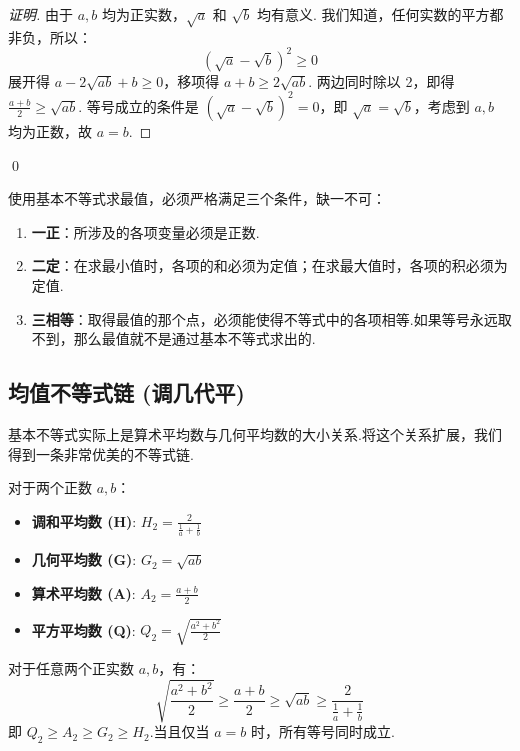 	\begin{proof}[证明]
		由于 $a, b$ 均为正实数，$\sqrt{a}$ 和 $\sqrt{b}$ 均有意义.
		我们知道，任何实数的平方都非负，所以：
		\begin{equation}
			(\sqrt{a} - \sqrt{b})^2 \ge 0
		\end{equation}
		展开得 $a - 2\sqrt{ab} + b \ge 0$，移项得 $a+b \ge 2\sqrt{ab}$.
		两边同时除以 2，即得 $\frac{a+b}{2} \ge \sqrt{ab}$.
		等号成立的条件是 $(\sqrt{a} - \sqrt{b})^2 = 0$，即 $\sqrt{a} = \sqrt{b}$，考虑到 $a, b$ 均为正数，故 $a=b$.
	\end{proof}
	\qed
	
			\begin{note}
				使用基本不等式求最值，必须严格满足三个条件，缺一不可：
				\begin{enumerate}
					\item \textbf{一正}：所涉及的各项变量必须是正数.
					\item \textbf{二定}：在求最小值时，各项的和必须为定值；在求最大值时，各项的积必须为定值.
					\item \textbf{三相等}：取得最值的那个点，必须能使得不等式中的各项相等.如果等号永远取不到，那么最值就不是通过基本不等式求出的.
				\end{enumerate}
			\end{note}
			
			\subsection{均值不等式链 (调几代平)}
			
			基本不等式实际上是算术平均数与几何平均数的大小关系.将这个关系扩展，我们得到一条非常优美的不等式链.
			
			\begin{definition}[四种平均数]
				对于两个正数 $a,b$：
				\begin{itemize}
					\item \textbf{调和平均数 (H)}: $H_2 = \frac{2}{\frac{1}{a}+\frac{1}{b}}$
					\item \textbf{几何平均数 (G)}: $G_2 = \sqrt{ab}$
					\item \textbf{算术平均数 (A)}: $A_2 = \frac{a+b}{2}$
					\item \textbf{平方平均数 (Q)}: $Q_2 = \sqrt{\frac{a^2+b^2}{2}}$
				\end{itemize}
			\end{definition}
			
			\begin{theorem}[均值不等式链]
				对于任意两个正实数 $a,b$，有：
				\begin{equation}
					\sqrt{\frac{a^2+b^2}{2}} \ge \frac{a+b}{2} \ge \sqrt{ab} \ge \frac{2}{\frac{1}{a}+\frac{1}{b}}
				\end{equation}
				即 $Q_2 \ge A_2 \ge G_2 \ge H_2$.当且仅当 $a=b$ 时，所有等号同时成立.
			\end{theorem}
			
